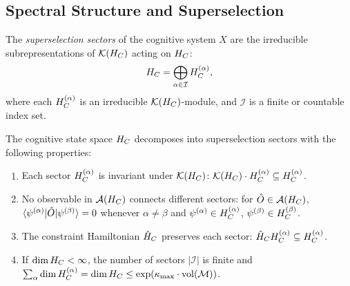 \subsection{Spectral Structure and Superselection}
\label{sec:ch5:spectral}

\begin{definition}
\label{def:5.11}
The \emph{superselection sectors} of the cognitive system $X$ are the
irreducible subrepresentations of $\mathcal{K}(H_C)$ acting on $H_C$:
\[
  H_C = \bigoplus_{\alpha \in \mathcal{I}} H_C^{(\alpha)},
\]
where each $H_C^{(\alpha)}$ is an irreducible $\mathcal{K}(H_C)$-module, and
$\mathcal{I}$ is a finite or countable index set.
\end{definition}

\begin{proposition}
\label{prop:5.3}
The cognitive state space $H_C$ decomposes into superselection sectors
with the following properties:
\begin{enumerate}
  \item[\textup{(i)}] Each sector $H_C^{(\alpha)}$ is invariant under
    $\mathcal{K}(H_C)$: $\mathcal{K}(H_C) \cdot H_C^{(\alpha)} \subseteq
    H_C^{(\alpha)}$.
  \item[\textup{(ii)}] No observable in $\mathcal{A}(H_C)$ connects different
    sectors: for $\hat{O} \in \mathcal{A}(H_C)$,
    $\langle\psi^{(\alpha)}|\hat{O}|\psi^{(\beta)}\rangle = 0$ whenever
    $\alpha \neq \beta$ and $\psi^{(\alpha)} \in H_C^{(\alpha)}$,
    $\psi^{(\beta)} \in H_C^{(\beta)}$.
  \item[\textup{(iii)}] The constraint Hamiltonian $\hat{H}_C$ preserves
    each sector: $\hat{H}_C H_C^{(\alpha)} \subseteq H_C^{(\alpha)}$.
  \item[\textup{(iv)}] If $\dim H_C < \infty$, the number of sectors
    $|\mathcal{I}|$ is finite and $\sum_\alpha \dim H_C^{(\alpha)} =
    \dim H_C \leq \exp(\kappa_{\max} \cdot \mathrm{vol}(\mathcal{M}))$.
\end{enumerate}
\end{proposition}

